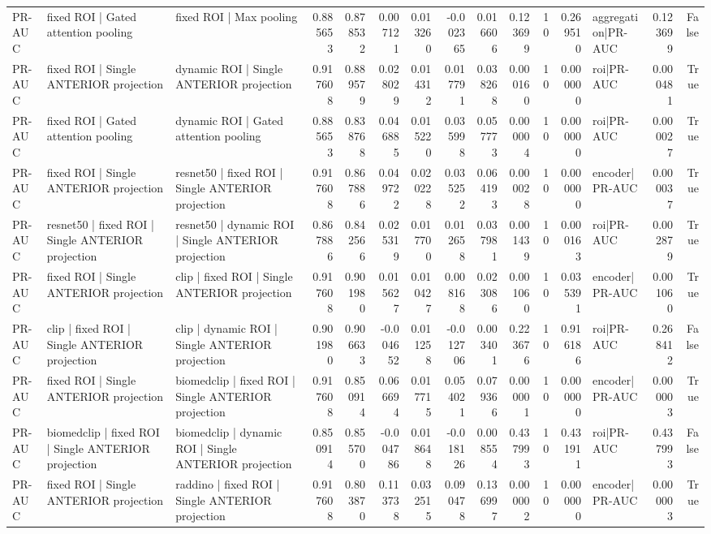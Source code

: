 \begin{table}
\begin{tabular}{lllrrrrrrrrrlrr}
PR-AUC & fixed ROI | Gated attention pooling & fixed ROI | Max pooling & 0.885653 & 0.878532 & 0.007121 & 0.013260 & -0.002365 & 0.016606 & 0.123699 & 10 & 0.269510 & aggregation|PR-AUC & 0.123699 & False \\
PR-AUC & fixed ROI | Single ANTERIOR projection & dynamic ROI | Single ANTERIOR projection & 0.917608 & 0.889579 & 0.028029 & 0.014312 & 0.017791 & 0.038268 & 0.000160 & 10 & 0.000000 & roi|PR-AUC & 0.000481 & True \\
PR-AUC & fixed ROI | Gated attention pooling & dynamic ROI | Gated attention pooling & 0.885653 & 0.838768 & 0.046885 & 0.015220 & 0.035998 & 0.057773 & 0.000004 & 10 & 0.000000 & roi|PR-AUC & 0.000027 & True \\
PR-AUC & fixed ROI | Single ANTERIOR projection & resnet50 | fixed ROI | Single ANTERIOR projection & 0.917608 & 0.867886 & 0.049722 & 0.020228 & 0.035252 & 0.064193 & 0.000028 & 10 & 0.000000 & encoder|PR-AUC & 0.000037 & True \\
PR-AUC & resnet50 | fixed ROI | Single ANTERIOR projection & resnet50 | dynamic ROI | Single ANTERIOR projection & 0.867886 & 0.842566 & 0.025319 & 0.017700 & 0.012658 & 0.037981 & 0.001439 & 10 & 0.000163 & roi|PR-AUC & 0.002879 & True \\
PR-AUC & fixed ROI | Single ANTERIOR projection & clip | fixed ROI | Single ANTERIOR projection & 0.917608 & 0.901980 & 0.015627 & 0.010427 & 0.008168 & 0.023086 & 0.001060 & 10 & 0.035391 & encoder|PR-AUC & 0.001060 & True \\
PR-AUC & clip | fixed ROI | Single ANTERIOR projection & clip | dynamic ROI | Single ANTERIOR projection & 0.901980 & 0.906633 & -0.004652 & 0.011258 & -0.012706 & 0.003401 & 0.223676 & 10 & 0.916186 & roi|PR-AUC & 0.268412 & False \\
PR-AUC & fixed ROI | Single ANTERIOR projection & biomedclip | fixed ROI | Single ANTERIOR projection & 0.917608 & 0.850914 & 0.066694 & 0.017715 & 0.054021 & 0.079366 & 0.000001 & 10 & 0.000000 & encoder|PR-AUC & 0.000003 & True \\
PR-AUC & biomedclip | fixed ROI | Single ANTERIOR projection & biomedclip | dynamic ROI | Single ANTERIOR projection & 0.850914 & 0.855700 & -0.004786 & 0.018648 & -0.018126 & 0.008554 & 0.437993 & 10 & 0.431911 & roi|PR-AUC & 0.437993 & False \\
PR-AUC & fixed ROI | Single ANTERIOR projection & raddino | fixed ROI | Single ANTERIOR projection & 0.917608 & 0.803870 & 0.113738 & 0.032515 & 0.090478 & 0.136997 & 0.000002 & 10 & 0.000000 & encoder|PR-AUC & 0.000003 & True \\

\end{tabular}
\end{table}
